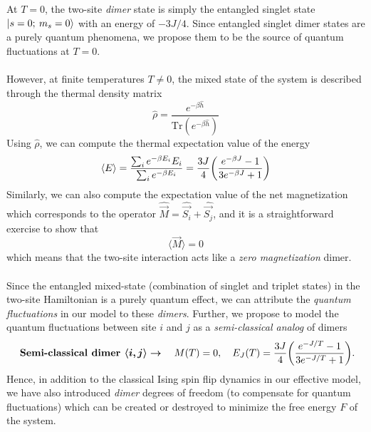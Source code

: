 \documentclass[../thesis_main.tex]{subfiles}
\begin{document}
At $T=0$, the two-site \textit{dimer} state is simply the entangled singlet state $\ket{s = 0; \: m_s = 0}$ with an energy of $-3J/4$. Since entangled singlet dimer states are a purely quantum phenomena, we propose them to be the source of quantum fluctuations at $T = 0$.~\\~\\
However, at finite temperatures $T \neq 0$, the mixed state of the system is described through the thermal density matrix 
\begin{equation}
    \hat{\rho} = \frac{e^{-\beta \hat{h}}}{\text{Tr} (e^{-\beta \hat{h}})}
\end{equation}
Using $\hat{\rho}$, we can compute the thermal expectation value of the energy 
\begin{equation}
    \expval{E} = \frac{\sum_i e^{-\beta E_i} E_i}{\sum_i e^{-\beta E_i}} = \frac{3J}{4}\qty(\frac{e^{-\beta J} - 1}{3e^{-\beta J} + 1})
\end{equation}
Similarly, we can also compute the expectation value of the net magnetization which corresponds to the operator $\hat{\vec{M}} = \hat{\vec{S_i}} + \hat{\vec{S_j}}$, and it is a straightforward exercise to show that
\begin{equation}
    \langle\vec{M}\rangle = 0 
\end{equation}
which means that the two-site interaction acts like a \textit{zero magnetization} dimer.~\\~\\
Since the entangled mixed-state (combination of singlet and triplet states) in the two-site Hamiltonian is a purely quantum effect, we can attribute the \textit{quantum fluctuations} in our model to these \textit{dimers}. Further, we propose to model the quantum fluctuations between site $i$ and $j$ as a \textit{semi-classical analog} of dimers 
\begin{equation}
    \text{ \textbf{Semi-classical dimer }} \boldsymbol{\langle i,j\rangle \rightarrow} \quad M(T)=0, \quad E_J(T) = \frac{3J}{4}\qty(\frac{e^{-J/T} - 1}{3e^{-J/T} + 1}).
    \label{dimer}
\end{equation}
Hence, in addition to the classical Ising spin flip dynamics in our effective model, we have also introduced \textit{dimer} degrees of freedom (to compensate for quantum fluctuations) which can be created or destroyed to minimize the free energy $F$ of the system.
\end{document}
